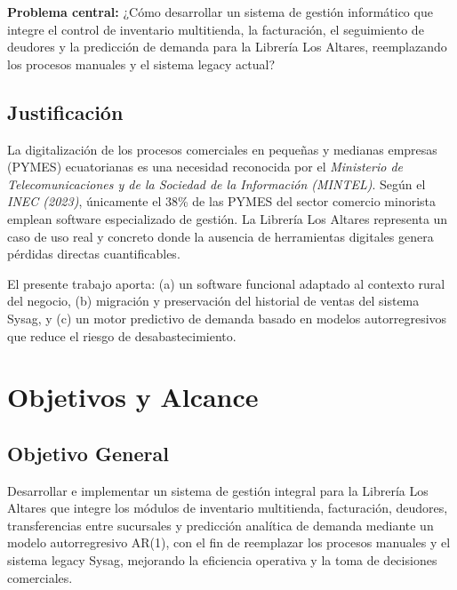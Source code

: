 \documentclass[12pt,a4paper,oneside]{report}
\begin{document}
\begin{infobox}
\textbf{Problema central:} ¿Cómo desarrollar un sistema de gestión informático que integre el control de inventario multitienda, la facturación, el seguimiento de deudores y la predicción de demanda para la Librería Los Altares, reemplazando los procesos manuales y el sistema legacy actual?
\end{infobox}

\section{Justificación}

La digitalización de los procesos comerciales en pequeñas y medianas empresas (PYMES) ecuatorianas es una necesidad reconocida por el \textit{Ministerio de Telecomunicaciones y de la Sociedad de la Información (MINTEL)}. Según el \textit{INEC (2023)}, únicamente el 38\% de las PYMES del sector comercio minorista emplean software especializado de gestión. La Librería Los Altares representa un caso de uso real y concreto donde la ausencia de herramientas digitales genera pérdidas directas cuantificables.

El presente trabajo aporta: (a) un software funcional adaptado al contexto rural del negocio, (b) migración y preservación del historial de ventas del sistema Sysag, y (c) un motor predictivo de demanda basado en modelos autorregresivos que reduce el riesgo de desabastecimiento.

\chapter{Objetivos y Alcance}

\section{Objetivo General}

Desarrollar e implementar un sistema de gestión integral para la Librería Los Altares que integre los módulos de inventario multitienda, facturación, deudores, transferencias entre sucursales y predicción analítica de demanda mediante un modelo autorregresivo AR(1), con el fin de reemplazar los procesos manuales y el sistema legacy Sysag, mejorando la eficiencia operativa y la toma de decisiones comerciales.
\end{document}
